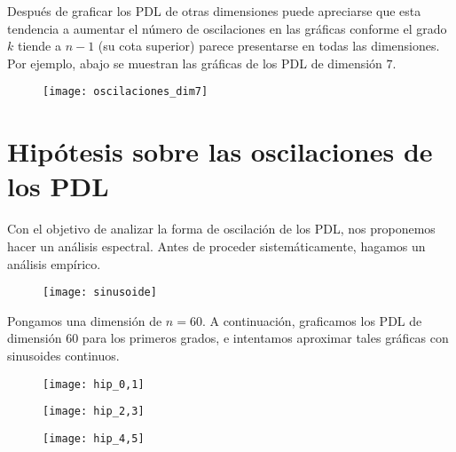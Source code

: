 Después de graficar los PDL de otras dimensiones
puede apreciarse que esta tendencia a aumentar el número
de oscilaciones en las gráficas conforme el grado $k$
tiende a $n-1$ (su cota superior)
parece presentarse en todas las dimensiones.
Por ejemplo, abajo se muestran las gráficas de los 
PDL de dimensión $7$.

\begin{figure}[H]
	\centering
	\texttt{[image: oscilaciones\_dim7]} 
\end{figure}	

\section{Hipótesis sobre las oscilaciones de los PDL}

Con el objetivo de analizar la forma
de oscilación de los PDL, nos proponemos
hacer un análisis espectral. Antes
de proceder sistemáticamente, hagamos un análisis empírico.
\begin{figure}[H]
	\centering
	\texttt{[image: sinusoide]} 
\end{figure}	

Pongamos una dimensión de $n = 60$. A continuación,
graficamos los PDL de dimensión $60$ para los primeros grados,
e intentamos aproximar tales gráficas con sinusoides continuos.


\begin{figure}[H]
	\centering
	\texttt{[image: hip\_0,1]} 
\end{figure}	

\begin{figure}[H]
	\centering
	\texttt{[image: hip\_2,3]} 
\end{figure}	

\begin{figure}[H]
	\centering
	\texttt{[image: hip\_4,5]} 
\end{figure}	


